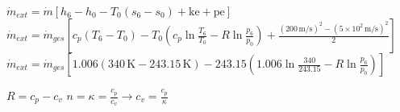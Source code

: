 \( \dot{m}_{ext} = \dot{m} \left[ h_6 - h_0 - T_0 (s_6 - s_0) + \text{ke} + \text{pe} \right] \)  
\( \dot{m}_{ext} = \dot{m}_{ges} \left[ c_p (T_6 - T_0) - T_0 \left( c_p \ln \frac{T_6}{T_0} - R \ln \frac{p_6}{p_0} \right) + \frac{(200 \, \text{m/s})^2 - (5 \times 10^2 \, \text{m/s})^2}{2} \right] \)  
\( \dot{m}_{ext} = \dot{m}_{ges} \left[ 1.006 (340 \, \text{K} - 243.15 \, \text{K}) - 243.15 \left( 1.006 \ln \frac{340}{243.15} - R \ln \frac{p_6}{p_0} \right) \right] \)  

\( R = c_p - c_v \)  
\( n = \kappa = \frac{c_p}{c_v} \rightarrow c_v = \frac{c_p}{\kappa} \)